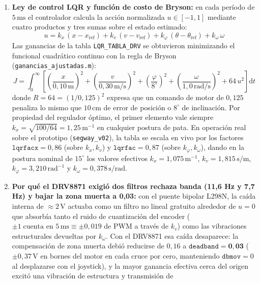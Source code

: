\documentclass[11pt,a4paper]{report}
\newcommand{\dd}{\mathrm{d}}
\newcommand{\ud}[1]{\,\mathrm{#1}}
\begin{document}
\begin{enumerate}[leftmargin=1.6em]
\item \textbf{Ley de control LQR y función de costo de Bryson:} en cada período de $5\ud{ms}$
      el controlador calcula la acción normalizada $u \in [-1, 1]$ mediante cuatro productos y
      tres sumas sobre el estado estimado:
      \[
      u = k_x\,(x - x_{\text{ref}}) + k_v\,(v - v_{\text{ref}}) + k_\varphi\,(\theta - \theta_{\text{ref}}) + k_\omega\,\omega
      \]
      Las ganancias de la tabla \texttt{LQR\_TABLA\_DRV} se obtuvieron minimizando el funcional
      cuadrático continuo con la regla de Bryson (\texttt{ganancias\_ajustadas.m}):
      \[
      J = \int_0^\infty \left[
        \left(\frac{x}{0{,}10\ud{m}}\right)^{\!2} +
        \left(\frac{v}{0{,}30\ud{m/s}}\right)^{\!2} +
        \left(\frac{\varphi}{8^\circ}\right)^{\!2} +
        \left(\frac{\omega}{1{,}0\ud{rad/s}}\right)^{\!2} +
        64\,u^2
      \right]\dd t
      \]
      donde $R = 64 = (1/0{,}125)^2$ expresa que un comando de motor de $0{,}125$ penaliza lo
      mismo que $10\ud{cm}$ de error de posición o $8^\circ$ de inclinación. Por propiedad del
      regulador óptimo, el primer elemento vale siempre $k_x = \sqrt{100/64} = 1{,}25\ud{m^{-1}}$
      en cualquier postura de pata. En operación real sobre el prototipo (\texttt{segway\_v02}),
      la tabla se escala en vivo por los factores $\texttt{lqrfacx} = 0{,}86$ (sobre $k_x, k_v$)
      y $\texttt{lqrfac} = 0{,}87$ (sobre $k_\varphi, k_\omega$), dando en la postura nominal de
      $15^\circ$ los valores efectivos $k_x = 1{,}075\ud{m^{-1}}$, $k_v = 1{,}815\ud{s/m}$,
      $k_\varphi = 3{,}210\ud{rad^{-1}}$ y $k_\omega = 0{,}378\ud{s/rad}$.
\item \textbf{Por qué el DRV8871 exigió dos filtros rechaza banda (11,6 Hz y 7,7 Hz) y bajar la zona muerta a 0,03:}
      con el puente bipolar L298N, la caída interna de $\approx 2\ud{V}$ actuaba como un filtro
      no lineal gratuito alrededor de $u = 0$ que absorbía tanto el ruido de cuantización del
      encoder ($\pm 1\;\text{cuenta en }5\ud{ms} \equiv \pm 0{,}019$ de PWM a través de $k_v$)
      como las vibraciones estructurales devueltas por $k_\omega$. Con el DRV8871 esa caída
      desaparece: la compensación de zona muerta debió reducirse de $0{,}16$ a
      $\mathbf{\texttt{deadband} = 0{,}03}$ ($\pm 0{,}37\ud{V}$ en bornes del motor en cada cruce
      por cero, manteniendo $\texttt{dbmov} = 0$ al desplazarse con el joystick), y la mayor
      ganancia efectiva cerca del origen excitó una vibración de estructura y transmisión de

\end{enumerate}
\end{document}
